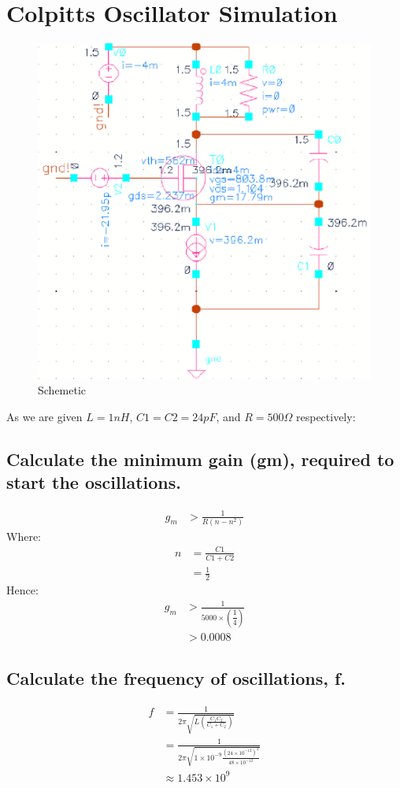 \documentclass[pdftex,12pt,a4paper]{article}
\begin{document}
\section{Colpitts Oscillator Simulation}
\begin{figure}[H]
\centering
\includegraphics[width=13cm]{ca1.png}
\caption{Schemetic}
\end{figure}
As we are given $L = 1 nH$, $C1 = C2 = 24 pF$, and $R = 500 \Omega$ respectively:
\subsection{Calculate the minimum gain (gm), required to start the oscillations.}
\begin{align}
g_m &>\frac{1}{R(n-n^2)} 
\end{align}
Where:
\begin{align}
n&=\frac{C1}{C1+C2}\\
&=\frac{1}{2}
\end{align}
Hence:
\begin{align}
g_m &>\frac{1}{5000\times(\dfrac{1}{4})}\\
&>0.0008
\end{align}
\subsection{Calculate the frequency of oscillations, f.}
\begin{align}
f&=\frac{1}{2\pi \sqrt{L(\frac{C_1 C_2}{C_1+C_2})}}\\
&=\frac{1}{2\pi \sqrt{1\times 10^{-9}\frac{(24\times 10^{-12})^2}{48\times 10^{-12}}}}\\
&\approx  1.453\times 10^{9}\\
\end{align}
\end{document}
